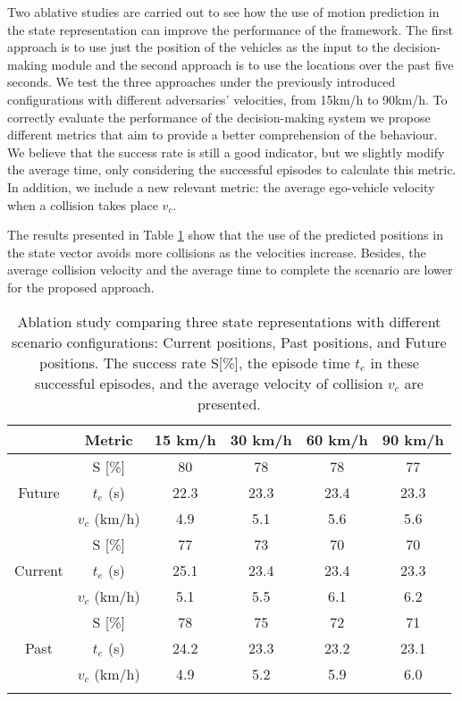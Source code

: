 Two ablative studies are carried out to see how the use of motion prediction in the state representation can improve the performance of the framework. The first approach is to use just the position of the vehicles as the input to the decision-making module and the second approach is to use the locations over the past five seconds. We test the three approaches under the previously introduced configurations with different adversaries' velocities, from 15km/h to 90km/h. To correctly evaluate the performance of the decision-making system we propose different metrics that aim to provide a better comprehension of the behaviour. We believe that the success rate is still a good indicator, but we slightly modify the average time, only considering the successful episodes to calculate this metric. In addition, we include a new relevant metric: the average ego-vehicle velocity when a collision takes place $v_{c}$.  

The results presented in Table \ref{table:chapter_8_Applications/dm_ablation_study_smarts} show that the use of the predicted positions in the state vector avoids more collisions as the velocities increase. Besides, the average collision velocity and the average time to complete the scenario are lower for the proposed approach. 

\begin{table}[h]
	\centering
	\captionsetup{justification=justified}
	\caption[Ablation study comparing three state representations with different scenario configurations]{Ablation study comparing three state representations with different scenario configurations: Current positions, Past positions, and Future positions. The success rate S[\%], the episode time $t_{e}$ in these successful episodes, and the average velocity of collision $v_{c}$ are presented.}
	\label{table:chapter_8_Applications/dm_ablation_study_smarts}
	\setlength{\extrarowheight}{2pt}
	\begin{tabular}{cccccc} 
		\ChangeRT{1pt}
		& Metric & 15 km/h & 30 km/h & 60 km/h & 90 km/h  \\
		\hline 
		\multirow{3}{*}{Future}
		&S [\%] & 80 & 78 & 78 & 77 \\ 
		&$t_{e}$ (s) & 22.3 & 23.3 & 23.4 & 23.3 \\
		&$v_{c}$ (km/h) & 4.9 & 5.1 & 5.6 & 5.6 \\
		\hline
		\multirow{3}{*}{Current}
		&S [\%] & 77 & 73 & 70 & 70 \\ 
		&$t_{e}$ (s) & 25.1 & 23.4 & 23.4 & 23.3 \\
		&$v_{c}$ (km/h) & 5.1 & 5.5 & 6.1 & 6.2 \\
		\hline
		\multirow{3}{*}{Past}
		&S [\%] & 78 & 75 & 72 & 71 \\ 
		&$t_{e}$ (s) & 24.2 & 23.3 & 23.2 & 23.1 \\
		&$v_{c}$ (km/h) & 4.9 & 5.2 & 5.9 & 6.0 \\
		\hline
		\ChangeRT{1pt}
	\end{tabular}
\end{table}

